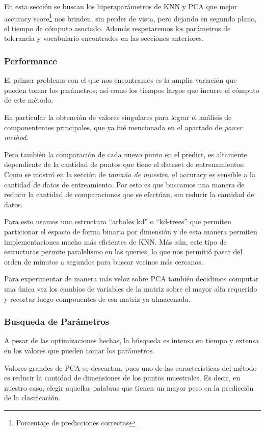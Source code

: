 En esta sección se buscan los hiperaparámetros de KNN y PCA que mejor
accuracy score\footnote{Porcentaje de predicciones correctas} nos brinden, sin perder de vista, pero dejando en segundo
plano, el tiempo de cómputo asociado. Además respetaremos los
parámetros de tolerancia y vocabulario encontrados en las secciones
anteriores.

\subsubsection{Performance}

El primer problema con el que nos encontramos es la amplia variación
que pueden tomar los parámetros; así como los tiempos largos que
incurre el cómputo de este método.

En particular la obtención de valores singulares para lograr el
análisis de componententes principales, que ya fué mencionada en el
apartado de \emph{power method}.

Pero también la comparación de cada nuevo punto en el predict, es
altamente dependiente de la cantidad de puntos que tiene el dataset de
entrenamientos. Como se mostró en la sección de \emph{tamaño de
  muestra}, el accuracy es sensible a la cantidad de datos de
entreamiento. Por esto es que buscamos una manera de reducir la
cantidad de comparaciones que se efectúan, sin reducir la cantidad de
datos.

Para esto usamos una estructura ``arboles kd'' o ``kd-trees'' que
permiten particionar el espacio de forma binaria por dimensión y de
esta manera permiten implementaciones mucho más eficientes de KNN. Más aún, este
tipo de estructuras permite paralelismo en las queries, lo que nos permitió
pasar del orden de minutos a segundos para buscar vecinos más cercanos.

Para experimentar de manera más veloz sobre PCA también decidimos computar una
única vez los cambios de variables de la matriz sobre el mayor alfa requerido
y recortar luego componentes de esa matriz ya almacenada.

\subsubsection{Busqueda de Parámetros}

A pesar de las optimizaciones hechas, la búsqueda es intensa en tiempo
y extensa en los valores que pueden tomar los parámetros.

Valores grandes de PCA se descartan, pues uno de las características
del método es reducir la cantidad de dimensiones de los puntos
muestrales. Es decir, en nuestro caso, elegir aquellas palabras que
tienen un mayor peso en la predicción de la clasificación.

